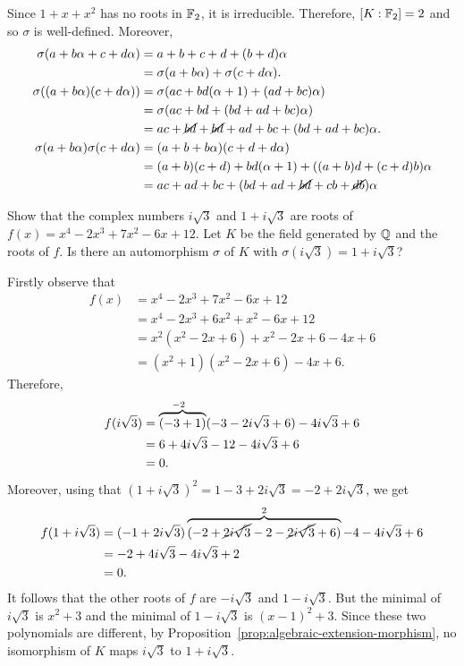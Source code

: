 \begin{solution}
    Since $1+x+x^2$ has no roots in $\mathbb F_2$, it is irreducible. Therefore, $[K:\mathbb F_2]=2$ and so $\sigma$ is well-defined. Moreover,
    \begin{align*}
        \sigma(a+b\alpha+c+d\alpha) &= a+b+c+d+(b+d)\alpha\\
            &=\sigma(a+b\alpha)+\sigma(c+d\alpha).\\
        \sigma((a+b\alpha)(c+d\alpha)) &= \sigma(ac+bd(\alpha+1)+(ad+bc)\alpha)\\
            &= \sigma(ac+bd+(bd+ad+bc)\alpha)\\
            &= ac+\cancel{bd}+\cancel{bd}+ad+bc+(bd+ad+bc)\alpha.\\
        \sigma(a+b\alpha)\sigma(c+d\alpha) &= (a+b+b\alpha)(c+d+d\alpha)\\
            &= (a+b)(c+d)+bd(\alpha+1)+((a+b)d+(c+d)b)\alpha\\
            &= ac + ad + bc +(bd+ad+\cancel{bd}+cb+\cancel{db})\alpha\phantom{\qedhere}
    \end{align*}
\end{solution}

\begin{probl}
    Show that the complex numbers\/ $i\sqrt{3}$ and\/ $1+i\sqrt{3}$ are roots of\/ $f(x)=x^4 - 2x^3 + 7x^2 - 6x + 12$. Let\/ $K$ be the field generated by\/ $\mathbb{Q}$ and the roots of\/ $f$. Is there an automorphism\/ $\sigma$ of\/ $K$ with\/ $\sigma(i\sqrt{3}) = 1 + i\sqrt{3}$?
\end{probl}

\begin{solution}
    Firstly observe that
    \begin{align*}
        f(x) &= x^4 - 2x^3 + 7x^2 - 6x + 12\\
            &= x^4 - 2x^3 + 6x^2 + x^2 - 6x + 12\\
            &= x^2(x^2-2x + 6) + x^2 - 2x + 6 - 4x + 6\\
            &= (x^2+1)(x^2-2x+6) - 4x+6.
    \end{align*}
    Therefore,
    \begin{align*}
        f(i\sqrt3) &= \overbrace{(-3+1)}^{-2\hphantom-}(-3-2i\sqrt3+6)- 4i\sqrt3 + 6\\
            &= 6+4i\sqrt3-12-4i\sqrt3 + 6\\
            &= 0.
    \end{align*}
    Moreover, using that $(1+i\sqrt3)^2=1-3+2i\sqrt3=-2+2i\sqrt3$, we get
    \begin{align*}
        f(1+i\sqrt3) &= (-1+2i\sqrt3)
                \overbrace{(-2+\cancel{2i\sqrt3}-2-\cancel{2i\sqrt3}+6)}^2-4-4i\sqrt3 + 6\\
            &= -2 + 4i\sqrt3 - 4i\sqrt3+2\\
            &= 0.
    \end{align*}
    It follows that the other roots of $f$ are $-i\sqrt3$ and $1-i\sqrt3$. But the minimal of $i\sqrt3$ is $x^2+3$ and the minimal of $1-i\sqrt3$ is $(x-1)^2+3$. Since these two polynomials are different, by Proposition~\ref{prop:algebraic-extension-morphism}, no isomorphism of $K$ maps $i\sqrt3$ to $1+i\sqrt3$.
\end{solution}

